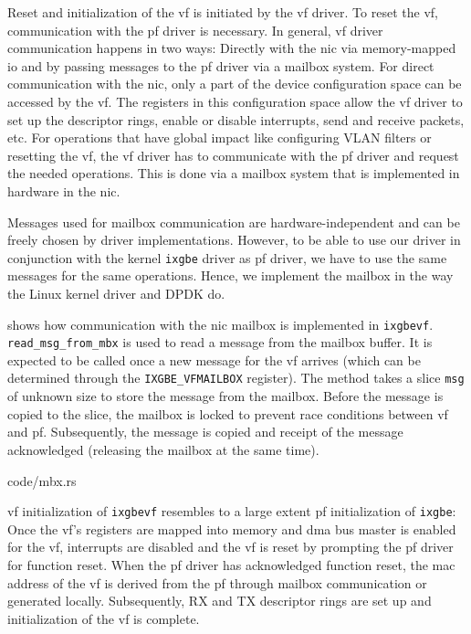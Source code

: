 Reset and initialization of the \ac{vf} is initiated by the \ac{vf} driver. To
reset the \ac{vf}, communication with the \ac{pf} driver is necessary. In
general, \ac{vf} driver communication happens in two ways: Directly with the
\ac{nic} via memory-mapped \ac{io} and by passing messages to the \ac{pf} driver
via a mailbox system. For direct communication with the \ac{nic}, only a part of
the device configuration space can be accessed by the \ac{vf}.  The registers in
this configuration space allow the \ac{vf} driver to set up the descriptor
rings, enable or disable interrupts, send and receive packets, etc.  For
operations that have global impact like configuring VLAN filters or resetting
the \ac{vf}, the \ac{vf} driver has to communicate with the \ac{pf} driver and
request the needed operations. This is done via a mailbox system that is
implemented in hardware in the \ac{nic}.

Messages used for mailbox communication are hardware-independent and can be
freely chosen by driver implementations. However, to be able to use our driver
in conjunction with the kernel \texttt{ixgbe} driver as \ac{pf} driver, we have
to use the same messages for the same operations. Hence, we implement the
mailbox in the way the Linux kernel driver and DPDK do.

 shows how communication with the \ac{nic} mailbox is implemented
in \texttt{ixgbevf}. \linebreak \texttt{read\_msg\_from\_mbx} is used to read a
message from the mailbox buffer. It is expected to be called once a new message
for the \ac{vf} arrives (which can be determined through the
\texttt{IXGBE\_VFMAILBOX} register). The method takes a slice \texttt{msg} of
unknown size to store the message from the mailbox. Before the message is copied
to the slice, the mailbox is locked to prevent race conditions between \ac{vf}
and \ac{pf}. Subsequently, the message is copied and receipt of the message
acknowledged (releasing the mailbox at the same time).

\begin{minipage}{\textwidth}
     {code/mbx.rs}
\end{minipage}

\ac{vf} initialization of \texttt{ixgbevf} resembles to a large extent \ac{pf}
initialization of \texttt{ixgbe}: Once the \ac{vf}'s registers are mapped into
memory and \ac{dma} bus master is enabled for the \ac{vf}, interrupts are
disabled and the \ac{vf} is reset by prompting the \ac{pf} driver for function
reset. When the \ac{pf} driver has acknowledged function reset, the \ac{mac}
address of the \ac{vf} is derived from the \ac{pf} through mailbox communication
or generated locally. Subsequently, RX and TX descriptor rings are set up and
initialization of the \ac{vf} is complete.

